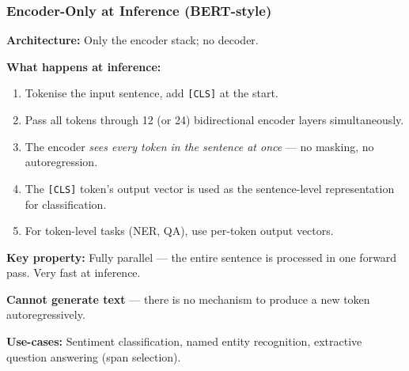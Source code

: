 \begin{frame}[fragile]\frametitle{Encoder-Only at Inference (BERT-style)}

\textbf{Architecture:} Only the encoder stack; no decoder.

\textbf{What happens at inference:}
\begin{enumerate}
\item Tokenise the input sentence, add \texttt{[CLS]} at the start.
\item Pass all tokens through 12 (or 24) bidirectional encoder layers simultaneously.
\item The encoder \emph{sees every token in the sentence at once} --- no masking, no autoregression.
\item The \texttt{[CLS]} token's output vector is used as the sentence-level representation for classification.
\item For token-level tasks (NER, QA), use per-token output vectors.
\end{enumerate}

\textbf{Key property:} Fully parallel --- the entire sentence is processed in one forward pass. Very fast at inference.

\textbf{Cannot generate text} --- there is no mechanism to produce a new token autoregressively.

\textbf{Use-cases:} Sentiment classification, named entity recognition, extractive question answering (span selection).

\end{frame}

